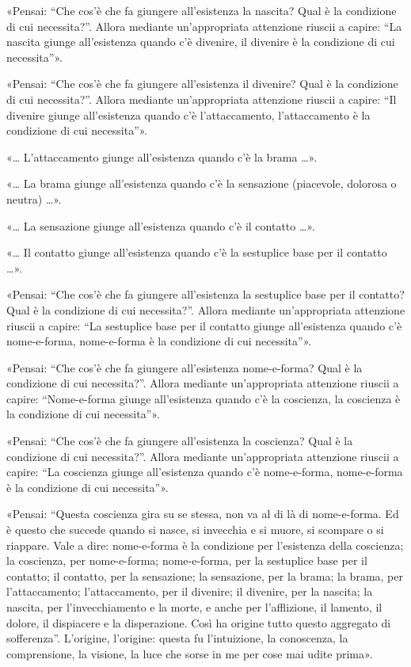 «Pensai: “Che cos’è che fa giungere all’esistenza la nascita? Qual è la
condizione di cui necessita?”. Allora mediante un’appropriata attenzione riuscii
a capire: “La nascita giunge all’esistenza quando c’è divenire, il divenire è la
condizione di cui necessita”».

«Pensai: “Che cos’è che fa giungere all’esistenza il divenire? Qual è la
condizione di cui necessita?”. Allora mediante un’appropriata attenzione riuscii
a capire: “Il divenire giunge all’esistenza quando c’è l’attaccamento,
l’attaccamento è la condizione di cui necessita”».

«… L’attaccamento giunge all’esistenza quando c’è la brama …».

«… La brama giunge all’esistenza quando c’è la sensazione (piacevole, dolorosa o
neutra) …».

«… La sensazione giunge all’esistenza quando c’è il contatto …».

«… Il contatto giunge all’esistenza quando c’è la sestuplice base per il
contatto …».

«Pensai: “Che cos’è che fa giungere all’esistenza la sestuplice base per il
contatto? Qual è la condizione di cui necessita?”. Allora mediante
un’appropriata attenzione riuscii a capire: “La sestuplice base per il contatto
giunge all’esistenza quando c’è nome-e-forma, nome-e-forma è la condizione di
cui necessita”».

«Pensai: “Che cos’è che fa giungere all’esistenza nome-e-forma? Qual è la
condizione di cui necessita?”. Allora mediante un’appropriata attenzione riuscii
a capire: “Nome-e-forma giunge all’esistenza quando c’è la coscienza, la
coscienza è la condizione di cui necessita”».

«Pensai: “Che cos’è che fa giungere all’esistenza la coscienza? Qual è la
condizione di cui necessita?”. Allora mediante un’appropriata attenzione riuscii
a capire: “La coscienza giunge all’esistenza quando c’è nome-e-forma,
nome-e-forma è la condizione di cui necessita”».

«Pensai: “Questa coscienza gira su se stessa, non va al di là di nome-e-forma.
Ed è questo che succede quando si nasce, si invecchia e si muore, si scompare o
si riappare. Vale a dire: nome-e-forma è la condizione per l’esistenza della
coscienza; la coscienza, per nome-e-forma; nome-e-forma, per la sestuplice base
per il contatto; il contatto, per la sensazione; la sensazione, per la brama; la
brama, per l’attaccamento; l’attaccamento, per il divenire; il divenire, per la
nascita; la nascita, per l’invecchiamento e la morte, e anche per l’afflizione,
il lamento, il dolore, il dispiacere e la disperazione. Così ha origine tutto
questo aggregato di sofferenza”. L’origine, l’origine: questa fu l’intuizione,
la conoscenza, la comprensione, la visione, la luce che sorse in me per cose mai
udite prima».

